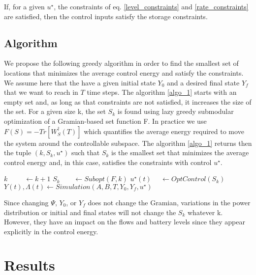 \documentclass[10pt,twoside%
                ,draft%
        ]{article}
\begin{document}
If, for a given $ u^{\star} $, the constraints of eq. \ref{level_constraints} and \ref{rate_constraints} are satisfied, then the control inputs satisfy the storage constraints.

\subsection{Algorithm}

We propose the following greedy algorithm in order to find the smallest set of locations that minimizes the average control energy and satisfy the constraints. We assume here that the have a given initial state $ Y_0 $ and a desired final state $ Y_f$ that we want to reach in $ T $ time steps. The algorithm \ref{algo_1} starts with an empty set and, as long as that constraints are not satisfied, it increases the size of the set. For a given size k, the set $ S_k $ is found using lazy greedy submodular optimization of a Gramian-based set function F. In practice we use $ F(S) = -Tr \left[ W_S^{\dagger}(T) \right] $ which quantifies the average energy required to move the system around the controllable subspace. The algorithm \ref{algo_1} returns then the tuple $ (k,S_k,u^{\star}) $ such that $ S_k $ is the smallest set that minimizes the average control energy and, in this case, satisfies the constraints with control $u^{\star}$. 

\begin{algorithm}
\label{algo_1}
        \begin{algorithmic}
    \State $k\ \ \ \ \ \ \ \ \ \ \ \gets k+1$
    \State $ S_k \ \ \ \ \ \ \ \ \ \gets Subopt(F, k)$
    \State $ u^{\star}(t)\ \ \ \ \ \ \gets OptControl(S_{k})$ 
    \State $ Y(t), \Lambda(t) \gets Simulation(A,B,T,Y_0,Y_f,u^{\star}) $

        \end{algorithmic}
\end{algorithm}
\normalsize
Since changing $ \Psi $, $Y_0$, or $Y_f$ does not change the Gramian, variations in the power distribution or initial and final states will not change the $S_k$ whatever k. However, they have an impact on the flows and battery levels since they appear explicitly in the control energy.



\section{Results}



\end{document}
